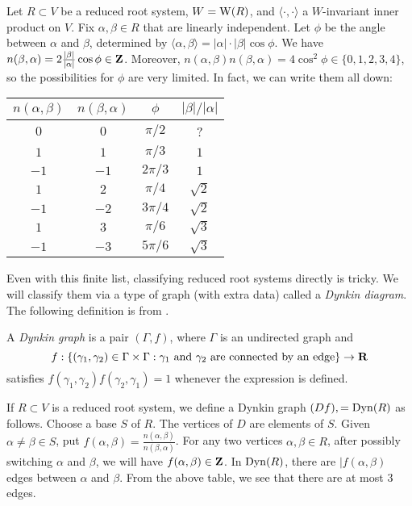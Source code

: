 Let $R\subset V$ be a reduced root system, $W=\operatorname{W}(R)$, and 
$\langle\cdot,\cdot\rangle$ a $W$-invariant inner product on $V$. Fix 
$\alpha,\beta\in R$ that are linearly independent. Let $\phi$ be the angle 
between $\alpha$ and $\beta$, determined by 
$\langle \alpha,\beta\rangle = |\alpha|\cdot |\beta| \cos\phi$. We have 
$n(\beta,\alpha)=2\frac{|\beta|}{|\alpha|}\cos\phi\in \mathbf{Z}$. Moreover, 
$n(\alpha,\beta)n(\beta,\alpha)=4\cos^2\phi\in \{0,1,2,3,4\}$, so the 
possibilities for $\phi$ are very limited. In fact, we can write them all 
down:  
\begin{center}
\begin{tabular}{c|c|c|c}
  $n(\alpha,\beta)$ & $n(\beta,\alpha)$ & $\phi$ & $|\beta|/|\alpha|$ \\ \hline 
  $0$  & $0$  & $\pi/2$  & ? \\
  $1$  & $1$  & $\pi/3$  & $1$ \\
  $-1$ & $-1$ & $2\pi/3$ & $1$ \\
  $1$  & $2$  & $\pi/4$  & $\sqrt 2$ \\
  $-1$ & $-2$ & $3\pi/4$ & $\sqrt 2$ \\
  $1$  & $3$  & $\pi/6$  & $\sqrt 3$ \\
  $-1$ & $-3$ & $5\pi/6$ & $\sqrt 3$
\end{tabular}
\end{center}

Even with this finite list, classifying reduced root systems directly is 
tricky. We will classify them via a type of graph (with extra data) called a 
\emph{Dynkin diagram}. The following definition is from 
\cite[VI \S 4.2]{bourbaki-lie-alg-4-6}.

\begin{definition}
A \emph{Dynkin graph} is a pair $(\Gamma,f)$, where $\Gamma$ is an 
undirected graph and 
\[
  f:\{(\gamma_1,\gamma_2)\in \Gamma\times\Gamma:\text{$\gamma_1$ and $\gamma_2$ are connected by an edge}\}\to \mathbf{R} 
\]
satisfies $f(\gamma_1,\gamma_2)f(\gamma_2,\gamma_1)=1$ whenever the expression 
is defined. 
\end{definition}

If $R\subset V$ is a reduced root system, we define a Dynkin graph 
$(Df),=\operatorname{Dyn}(R)$ as follows. Choose a base $S$ of $R$. The vertices of $D$ 
are elements of $S$. Given $\alpha\ne\beta\in S$, put 
$f(\alpha,\beta)=\frac{n(\alpha,\beta)}{n(\beta,\alpha)}$. For any two 
vertices $\alpha,\beta\in R$, after possibly switching $\alpha$ and 
$\beta$, we will have $f(\alpha,\beta)\in \mathbf{Z}$. In $\operatorname{Dyn}(R)$, there are 
$|f(\alpha,\beta)$ edges between $\alpha$ and $\beta$. From the above table, 
we see that there are at most $3$ edges. 

